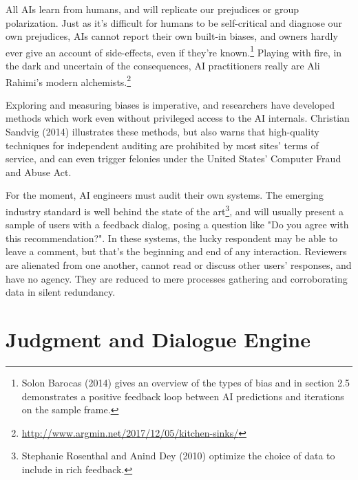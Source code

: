 \documentclass[format=sigconf]{acmart}
\begin{document}
All AIs learn from humans, and will replicate our prejudices or group polarization.  Just as it's difficult for humans to be self-critical and diagnose our own prejudices, AIs cannot report their own built-in biases, and owners hardly ever give an account of side-effects, even if they're known.\footnote{Solon Barocas (2014) \citep{barocas2014data} gives an overview of the types of bias and in section 2.5 demonstrates a positive feedback loop between AI predictions and iterations on the sample frame.}  Playing with fire, in the dark and uncertain of the consequences, AI practitioners really are Ali Rahimi's modern alchemists.\footnote{\url{http://www.argmin.net/2017/12/05/kitchen-sinks/}}

Exploring and measuring biases is imperative, and researchers have developed methods which work even without privileged access to the AI internals.  Christian Sandvig (2014) \citep{Sandvig} illustrates these methods, but also warns that high-quality techniques for independent auditing are prohibited by most sites' terms of service, and can even trigger felonies under the United States' Computer Fraud and Abuse Act.

For the moment, AI engineers must audit their own systems.  The emerging industry standard is well behind the state of the art\footnote{Stephanie Rosenthal and Anind Dey (2010) \citep{Rosenthal2010} optimize the choice of data to include in rich feedback.}, and will usually present a sample of users with a feedback dialog, posing a question like "Do you agree with this recommendation?".  In these systems, the lucky respondent may be able to leave a comment, but that's the beginning and end of any interaction.  Reviewers are alienated from one another, cannot read or discuss other users' responses, and have no agency.  They are reduced to mere processes gathering and corroborating data in silent redundancy.

\section{Judgment and Dialogue Engine}
\end{document}
